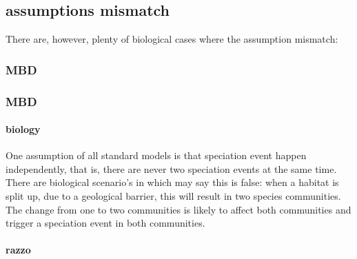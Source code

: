 {%
\subsection{assumptions mismatch}

There are, however, plenty of biological cases where the assumption
mismatch: 

\subsubsection{MBD}

\subsubsection{MBD}

\paragraph{biology}

One assumption of all standard models is that speciation event happen
independently, that is, there are never two speciation events at the same time. 
There are biological scenario's in which may say
this is false: when a habitat is split up, 
due to a geological barrier, this will result in two 
species communities. The change from one to two communities is likely
to affect both communities and trigger a speciation event in both
communities. 


\paragraph{razzo}

}

